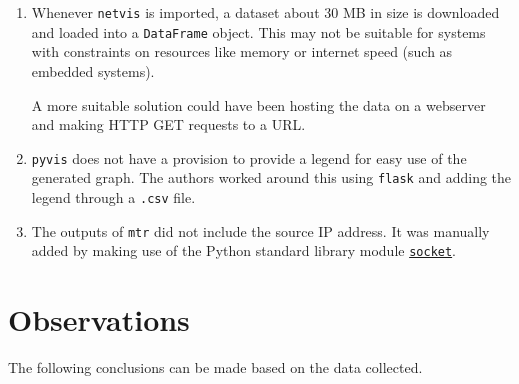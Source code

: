 \documentclass[journal,12pt,twocolumn]{IEEEtran}
\begin{document}
\begin{enumerate}
     \item Whenever \texttt{netvis} is imported, a dataset about 30 MB in size
     is downloaded and loaded into a \texttt{DataFrame} object. This may not be
     suitable for systems with constraints on resources like memory or internet
     speed (such as embedded systems).

     A more suitable solution could have been hosting the data on a webserver
     and making HTTP GET requests to a URL.
     \item \texttt{pyvis} does not have a provision to provide a legend for easy
     use of the generated graph. The authors worked around this using
     \texttt{flask} and adding the legend through a \texttt{.csv} file.
     \item The outputs of \texttt{mtr} did not include the source IP address. It
     was manually added by making use of the Python standard library module
     \href{https://docs.python.org/3/library/socket.html}{\texttt{socket}}.
\end{enumerate}

\section{Observations}
The following conclusions can be made based on the data collected.
\end{document}
